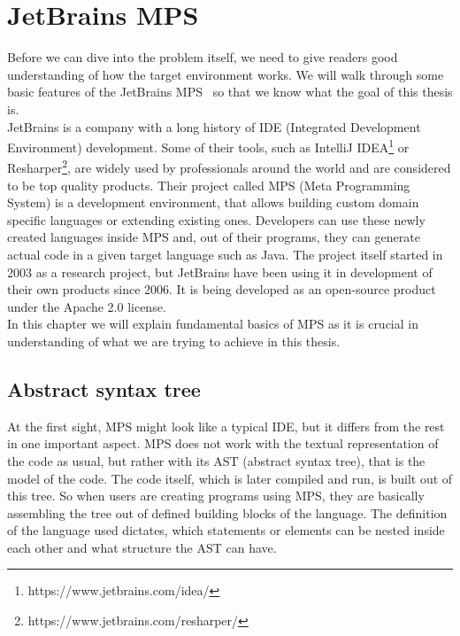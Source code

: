 \chapter{JetBrains MPS}
\label{chap:jetbrains_mps}

Before we can dive into the problem itself, we need to give readers good understanding of how the target environment works.
We will walk through some basic features of the JetBrains MPS~\cite{MPS} so that we know what the goal of this thesis is.
\\

JetBrains is a company with a long history of IDE (Integrated Development Environment) development.
Some of their tools, such as IntelliJ IDEA\footnote{https://www.jetbrains.com/idea/} or Resharper\footnote{https://www.jetbrains.com/resharper/}, are widely used by professionals around the world and are considered to be top quality products.
Their project called MPS (Meta Programming System) is a development environment, that allows building custom domain specific languages or extending existing ones.
Developers can use these newly created languages inside MPS and, out of their programs, they can generate actual code in a given target language such as Java.
The project itself started in 2003 as a research project, but JetBrains have been using it in development of their own products since 2006.
It is being developed as an open-source product under the Apache 2.0 license.
\\

In this chapter we will explain fundamental basics of MPS as it is crucial in understanding of what we are trying to achieve in this thesis.

\section{Abstract syntax tree}
At the first sight, MPS might look like a typical IDE, but it differs from the rest in one important aspect.
MPS does not work with the textual representation of the code as usual, but rather with its AST (abstract syntax tree), that is the model of the code.
The code itself, which is later compiled and run, is built out of this tree.
So when users are creating programs using MPS, they are basically assembling the tree out of defined building blocks of the language.
The definition of the language used dictates, which statements or elements can be nested inside each other and what structure the AST can have.
\\

